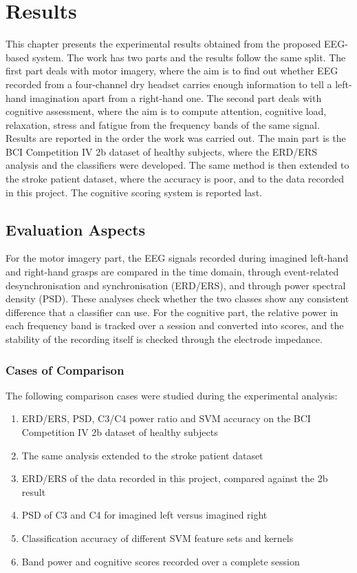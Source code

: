 \chapter{Results}

This chapter presents the experimental results obtained from the proposed EEG-based
system. The work has two parts and the results follow the same split. The first part deals
with motor imagery, where the aim is to find out whether EEG recorded from a four-channel
dry headset carries enough information to tell a left-hand imagination apart from a
right-hand one. The second part deals with cognitive assessment, where the aim is to
compute attention, cognitive load, relaxation, stress and fatigue from the frequency bands
of the same signal. Results are reported in the order the work was carried out. The main
part is the BCI Competition IV 2b dataset of healthy subjects, where the ERD/ERS analysis
and the classifiers were developed. The same method is then extended to the stroke patient
dataset, where the accuracy is poor, and to the data recorded in this project. The
cognitive scoring system is reported last.

\section{Evaluation Aspects}

For the motor imagery part, the EEG signals recorded during imagined left-hand and
right-hand grasps are compared in the time domain, through event-related desynchronisation
and synchronisation (ERD/ERS), and through power spectral density (PSD). These analyses
check whether the two classes show any consistent difference that a classifier can use. For
the cognitive part, the relative power in each frequency band is tracked over a session and
converted into scores, and the stability of the recording itself is checked through the
electrode impedance.

\subsection{Cases of Comparison}

The following comparison cases were studied during the experimental analysis:

\begin{enumerate}
    \item ERD/ERS, PSD, C3/C4 power ratio and SVM accuracy on the BCI Competition IV 2b
          dataset of healthy subjects
    \item The same analysis extended to the stroke patient dataset
    \item ERD/ERS of the data recorded in this project, compared against the 2b result
    \item PSD of C3 and C4 for imagined left versus imagined right
    \item Classification accuracy of different SVM feature sets and kernels
    \item Band power and cognitive scores recorded over a complete session
\end{enumerate}

